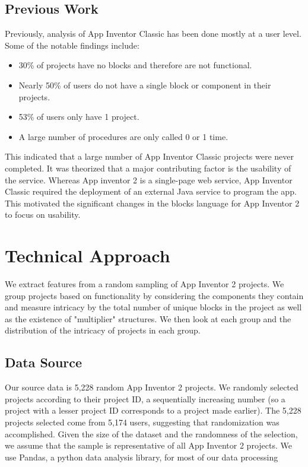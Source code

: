 \documentclass[conference]{IEEEtran}
\begin{document}
\subsection{Previous Work}
Previously, analysis of App Inventor Classic has been done mostly at a user level.\cite{blocks:okerlund} Some of the notable findings include:
\begin{itemize}
	\item 30\% of projects have no blocks and therefore are not functional.
	\item Nearly 50\% of users do not have a single block or component in their projects.
	\item 53\% of users only have 1 project.
	\item A large number of procedures are only called 0 or 1 time.
\end{itemize}
This indicated that a large number of App Inventor Classic projects were never completed. It was theorized that a major contributing factor is the usability of the service. Whereas App inventor 2 is a single-page web service, App Inventor Classic required the deployment of an external Java service to program the app. This motivated the significant changes in the blocks language for App Inventor 2 to focus on usability.

\section{Technical Approach}

We extract features from a random sampling of App Inventor 2 projects. We group projects based on functionality by considering the components they contain and measure intricacy by the total number of unique blocks in the project as well as the existence of "multiplier" structures. We then look at each group and the distribution of the intricacy of projects in each group.

\subsection{Data Source}
Our source data is 5,228 random App Inventor 2 projects. We randomly selected projects according to their project ID, a sequentially increasing number (so a project with a lesser project ID corresponds to a project made earlier). The 5,228 projects selected come from 5,174 users, suggesting that randomization was accomplished. Given the size of the dataset and the randomness of the selection, we assume that the sample is representative of all App Inventor 2 projects. We use Pandas, a python data analysis library, for most of our data processing 
\end{document}
